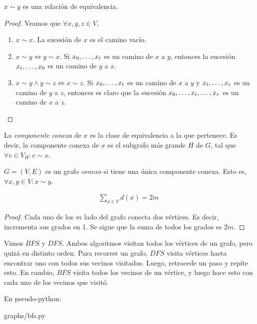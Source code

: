 \begin{proposition}
$x \sim y$ es una relación de equivalencia.
\end{proposition}
\begin{proof}
Veamos que $\forall x,y,z \in V,$
\begin{enumerate}
    \item $x \sim x$. La sucesión de $x$ es el camino vacío.
    
    \item $x \sim y \iff y \sim x$. Si $x_0, \mathellipsis, x_t$ es un camino de $x$ a $y$, entonces la sucesión $x_t, \mathellipsis, x_0$ es un camino de $y$ a $x$.
    \item $x \sim y \wedge y \sim z \iff x \sim z$. Si $x_0, \mathellipsis, x_t$ es un camino de $x$ a $y$ y $x_{t}, \mathellipsis, x_{r}$ es un camino de $y$ a $z$, entonces es claro que la sucesión $x_0, \mathellipsis, x_t, \mathellipsis, x_r$ es un camino de $x$ a $z$.
\end{enumerate}
\end{proof}
\begin{definition}
La \emph{componente conexa} de $x$ es la clase de equivalencia a la que pertenece. Es decir, la componente conexa de $x$ es el subgrafo más grande $H$ de $G$, tal que $\forall v \in V_H \colon v \sim x$.

$G=(V,E)$ es un grafo \emph{conexo} si tiene una única componente conexa. Esto es, $\forall x,y \in V \colon x \sim y$.
\end{definition}

\begin{proposition}
\begin{align}
\sum_{x\in V} d(x) = 2m \label{handshaking_lemma}
\end{align}
\end{proposition}

\begin{proof}
Cada uno de los $m$ lado del grafo conecta dos vértices. Es decir, incrementa sus grados en 1. Se sigue que la suma de todos los grados es $2m$.
\end{proof}


\begin{definition}
  Vimos $BFS$ y $DFS$. Ambos algoritmos visitan todos los vértices de un
  grafo, pero quizá en distinto orden. Para recorrer un grafo, $DFS$ visita
  vértices hasta encontrar uno con todos sus vecinos visitados. Luego,
  retrocede un paso y repite esto. En cambio, $BFS$ visita todos los vecinos
  de un vértice, y luego hace esto con cada uno de los vecinos que visitó.

  En pseudo-python:

\begin{lstinputlisting}[language=python]{graphs/bfs.py}
\end{lstinputlisting}
\end{definition}

